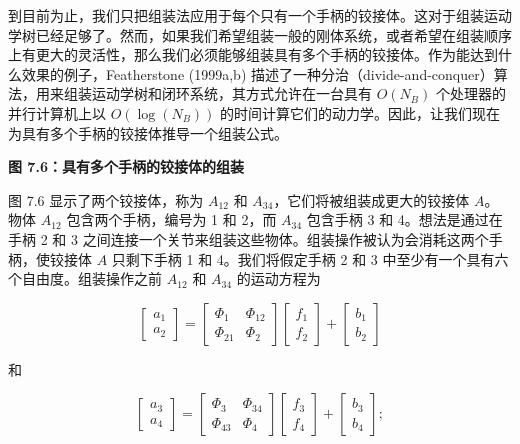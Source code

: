 \documentclass[10pt,a4paper]{book}
\theoremstyle{thmstyle} %
\theoremstyle{defstyle} %
\theoremstyle{prostyle} %
\begin{document}
到目前为止，我们只把组装法应用于每个只有一个手柄的铰接体。这对于组装运动学树已经足够了。然而，如果我们希望组装一般的刚体系统，或者希望在组装顺序上有更大的灵活性，那么我们必须能够组装具有多个手柄的铰接体。作为能达到什么效果的例子，Featherstone (1999a,b) 描述了一种分治（divide-and-conquer）算法，用来组装运动学树和闭环系统，其方式允许在一台具有 $O(N_B)$ 个处理器的并行计算机上以 $O(\log(N_B))$ 的时间计算它们的动力学。因此，让我们现在为具有多个手柄的铰接体推导一个组装公式。



\noindent\textbf{图 7.6：具有多个手柄的铰接体的组装}





图 7.6 显示了两个铰接体，称为 $A_{12}$ 和 $A_{34}$，它们将被组装成更大的铰接体 $A$。物体 $A_{12}$ 包含两个手柄，编号为 1 和 2，而 $A_{34}$ 包含手柄 3 和 4。想法是通过在手柄 2 和 3 之间连接一个关节来组装这些物体。组装操作被认为会消耗这两个手柄，使铰接体 $A$ 只剩下手柄 1 和 4。我们将假定手柄 2 和 3 中至少有一个具有六个自由度。组装操作之前 $A_{12}$ 和 $A_{34}$ 的运动方程为



$$
\left[ { \begin{array}{l} { a _ { 1 } } \\{ a _ { 2 } } \end{array} } \right] = \left[ { \begin{array}{ll} { \Phi _ { 1 } } & { \Phi _ { 12 } } \\{ \Phi _ { 21 } } & { \Phi _ { 2 } } \end{array} } \right] \left[ { \begin{array}{l} { f _ { 1 } } \\{ f _ { 2 } } \end{array} } \right] + \left[ { \begin{array}{l} { b _ { 1 } } \\{ b _ { 2 } } \end{array} } \right]
$$



和



$$
\left[ { \begin{array}{l} { a _ { 3 } } \\{ a _ { 4 } } \end{array} } \right] = \left[ { \begin{array}{ll} { \Phi _ { 3 } } & { \Phi _ { 34 } } \\{ \Phi _ { 43 } } & { \Phi _ { 4 } } \end{array} } \right] \left[ { \begin{array}{l} { f _ { 3 } } \\{ f _ { 4 } } \end{array} } \right] + \left[ { \begin{array}{l} { b _ { 3 } } \\{ b _ { 4 } } \end{array} } \right] ;
$$
\end{document}
